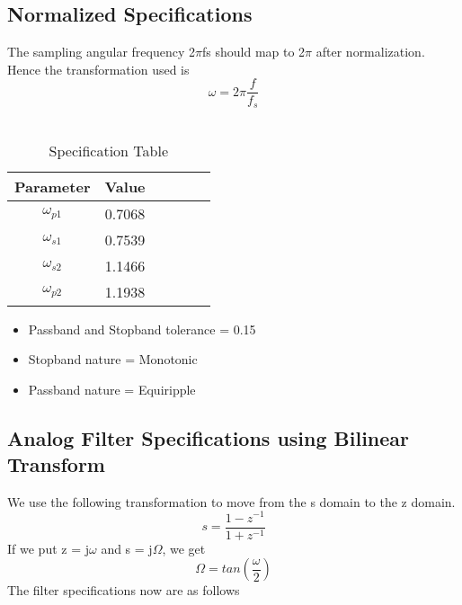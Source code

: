 \documentclass[12pt]{article}
\begin{document}
\subsection{\textbf{Normalized Specifications}}
The sampling angular frequency 2$\pi$fs should map to 2$\pi$ after normalization.
Hence the transformation used is
\begin{equation*}
    \omega = 2\pi\frac{f}{f_s}
\end{equation*}
\\

\begin{table}[!hbt]
		\begin{center}
		\caption{Specification Table}
		\begin{tabular}{|c|c|c|c|c|c|}
			\hline
			  Parameter & Value \\
			\hline
			 $\omega_{p1}$& 0.7068 \\
			\hline
			 $\omega_{s1}$ &  0.7539\\
			\hline
			 $\omega_{s2}$ & 1.1466\\
			\hline
		     $\omega_{p2}$ & 1.1938\\
			\hline
		
		\end{tabular}
		\end{center}
\end{table}


\begin{itemize}
    \item Passband and Stopband tolerance = 0.15
    \item Stopband nature = Monotonic
    \item Passband nature = Equiripple
\end{itemize}






\subsection{\textbf{Analog Filter Specifications using Bilinear Transform}}
We use the following transformation to move from the s domain to the z
domain.
\begin{equation*}
    s = \frac{1-z^{-1}}{1+z^{-1}}
    
\end{equation*}
If we put z = j$\omega$ and s = j$\Omega$, we get
\begin{equation*}
    \Omega = tan(\frac{\omega}{2})
\end{equation*}
\newpage
The filter specifications now are as follows
\end{document}
